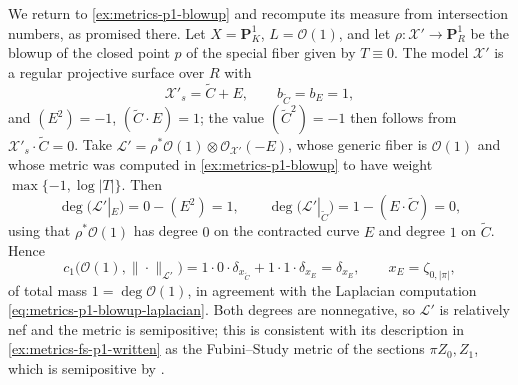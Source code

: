 \begin{example}
\label{ex:metrics-cl-p1-blowup}
We return to \cref{ex:metrics-p1-blowup} and recompute its measure from
intersection numbers, as promised there. Let $X=\mathbf P^1_K$,
$L=\mathcal O(1)$, and let $\rho:\mathcal X'\to\mathbf P^1_R$ be the
blowup of the closed point $p$ of the special fiber given by $T\equiv0$.
The model $\mathcal X'$ is a regular projective surface over $R$ with
\[
 \mathcal X'_s=\widetilde C+E,\qquad b_{\widetilde C}=b_E=1,
\]
and $(E^2)=-1$, $(\widetilde C\cdot E)=1$; the value
$(\widetilde C^2)=-1$ then follows from
$\mathcal X'_s\cdot\widetilde C=0$. Take
$\mathcal L'=\rho^*\mathcal O(1)\otimes\mathcal O_{\mathcal X'}(-E)$, whose
generic fiber is $\mathcal O(1)$ and whose metric was computed in
\cref{ex:metrics-p1-blowup} to have weight $\max\{-1,\log|T|\}$. Then
\[
 \deg\bigl(\mathcal L'|_{E}\bigr)=0-(E^2)=1,
 \qquad
 \deg\bigl(\mathcal L'|_{\widetilde C}\bigr)
 =1-(E\cdot\widetilde C)=0,
\]
using that $\rho^*\mathcal O(1)$ has degree $0$ on the contracted curve
$E$ and degree $1$ on $\widetilde C$. Hence
\[
 c_1\bigl(\mathcal O(1),\|\cdot\|_{\mathcal L'}\bigr)
 =1\cdot0\cdot\delta_{x_{\widetilde C}}+1\cdot1\cdot\delta_{x_E}
 =\delta_{x_E},
 \qquad x_E=\zeta_{0,|\pi|},
\]
of total mass $1=\deg\mathcal O(1)$, in agreement with the Laplacian
computation \eqref{eq:metrics-p1-blowup-laplacian}. Both degrees are
nonnegative, so $\mathcal L'$ is relatively nef and the metric is
semipositive; this is consistent with its description in
\cref{ex:metrics-fs-p1-written} as the Fubini--Study metric of the sections
$\pi Z_0,Z_1$, which is semipositive by
.
\end{example}

